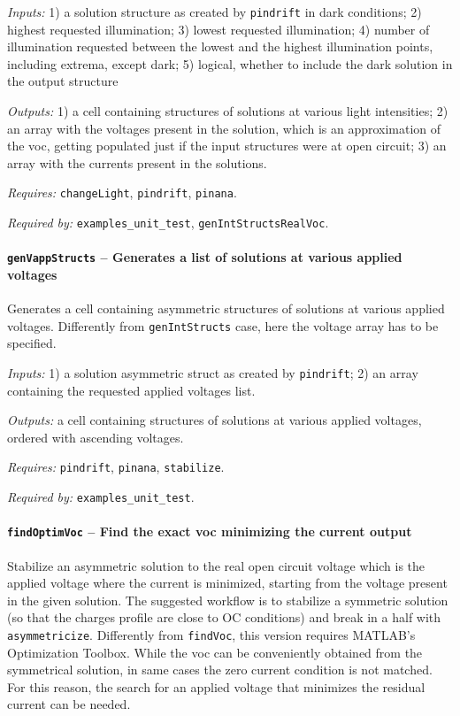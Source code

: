 		\textit{Inputs:} 1) a solution structure as created by \texttt{pin\-drift} in dark conditions; 
		2) highest requested illumination;
		3) lowest requested illumination;
		4) number of illumination requested between the lowest and the highest illumination points, including extrema, except dark;
		5) logical, whether to include the dark solution in the output structure
		
\textit{Outputs:} 1) a cell containing structures of solutions at various light
     intensities;
2) an array with the voltages present in the solution, which is
     an approximation of the \gls{voc}, getting populated just if the input
     structures were at open circuit;
 3) an array with the currents present in the solutions.
 
\textit{Requires:} \texttt{change\-Light}, \texttt{pin\-drift}, \texttt{pinana}.

\textit{Required by:} \texttt{examples\_unit\_test}, \texttt{gen\-Int\-Structs\-Real\-Voc}.

		\paragraph{\texttt{gen\-Vapp\-Structs} -- Generates a list of solutions at various applied voltages}\label{genVappStructs}
Generates a cell containing asymmetric structures of solutions at various applied voltages.
Differently from \texttt{gen\-Int\-Structs} case, here the voltage array has to be specified.

\textit{Inputs:} 1) a solution asymmetric struct as created by \texttt{pin\-drift};
2) an array containing the requested applied voltages list.

\textit{Outputs:} a cell containing structures of solutions at various applied
     voltages, ordered with ascending voltages.
     
\textit{Requires:} \texttt{pin\-drift}, \texttt{pinana}, \texttt{stabilize}.

\textit{Required by:} \texttt{examples\_unit\_test}.

		\paragraph{\texttt{find\-Optim\-Voc} -- Find the exact \gls{voc} minimizing the current output}
Stabilize an asymmetric solution to the real open circuit voltage
which is the applied voltage where the current is minimized,
starting from the voltage present in the given solution. The suggested
workflow is to stabilize a symmetric solution (so that the charges
profile are close to OC conditions) and break in a half with
\texttt{asymmetricize}.
Differently from \texttt{find\-Voc}, this version requires MATLAB's Optimization Toolbox.
While the \gls{voc} can be conveniently obtained from the symmetrical solution, in same cases the zero current condition is not matched.
For this reason, the search for an applied voltage that minimizes the residual current can be needed.
		
